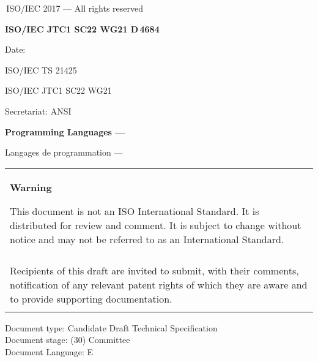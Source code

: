 

\thispagestyle{empty}
{\raisebox{.35ex}{\smaller\copyright}}\,ISO/IEC 2017 --- All rights reserved
\vspace{2ex}

\begin{flushright}
\textbf{ISO/IEC JTC1 SC22 WG21 D\,\LARGE4684}

Date: \reldate

ISO/IEC TS 21425

ISO/IEC JTC1 SC22 WG21

Secretariat: ANSI

\end{flushright}

\vfill

\textbf{\LARGE Programming Languages --- \doctitle}

Langages de programmation --- \frtitle

\vfill

\begin{tabular}{|p{\hsize}|}
\hline
\begin{center}
\textbf{Warning}
\end{center}

\vspace{2ex}

This document is not an ISO International Standard. It is distributed
for review and comment. It is subject to change without notice and may
not be referred to as an International Standard.\\\\

Recipients of this draft are invited to submit, with their comments,
notification of any relevant patent rights of which they are aware
and to provide supporting documentation.\\\\
\hline
\end{tabular}

\vfill
\noindent
Document type: Candidate Draft Technical Specification\\
Document stage: (30) Committee\\
Document Language: E
\pagebreak

\thispagestyle{cpppage}

